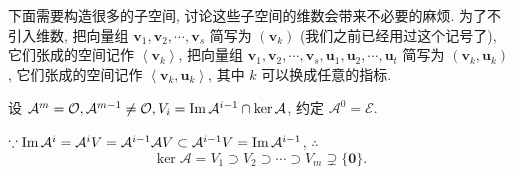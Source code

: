 \documentclass[color=black,device=normal,lang=cn,mode=geye]{elegantnote}
\begin{document}
下面需要构造很多的子空间, 讨论这些子空间的维数会带来不必要的麻烦. 为了不引入维数, 把向量组 $\boldsymbol{v}_1,\boldsymbol{v}_2,\cdots,\boldsymbol{v}_s$ 简写为 $(\boldsymbol{v}_k)$ (我们之前已经用过这个记号了), 它们张成的空间记作 $\left<\boldsymbol{v}_k\right>$, 把向量组 $\boldsymbol{v}_1,\boldsymbol{v}_2,\cdots,\boldsymbol{v}_s,\boldsymbol{u}_1,\boldsymbol{u}_2,\cdots,\boldsymbol{u}_t$ 简写为 $(\boldsymbol{v}_k,\boldsymbol{u}_k)$, 它们张成的空间记作 $\left<\boldsymbol{v}_k,\boldsymbol{u}_k\right>$, 其中 $k$ 可以换成任意的指标.

设 $\mathcal{A}^m=\mathcal{O},\mathcal{A}^{m-1}\neq\mathcal{O},V_i=\operatorname{Im} \mathcal{A}^{i-1}\cap\ker\mathcal{A}$, 约定 $\mathcal{A}^0=\mathcal{E}$.

$\because\operatorname{Im} \mathcal{A}^i=\mathcal{A}^iV=\mathcal{A}^{i-1}\mathcal{A}V\subset\mathcal{A}^{i-1}V=\operatorname{Im} \mathcal{A}^{i-1}$, $\therefore$
\[\ker\mathcal{A}=V_1\supset V_2\supset\cdots\supset V_m\supsetneq\{\boldsymbol{0}\}.\]
\end{document}
